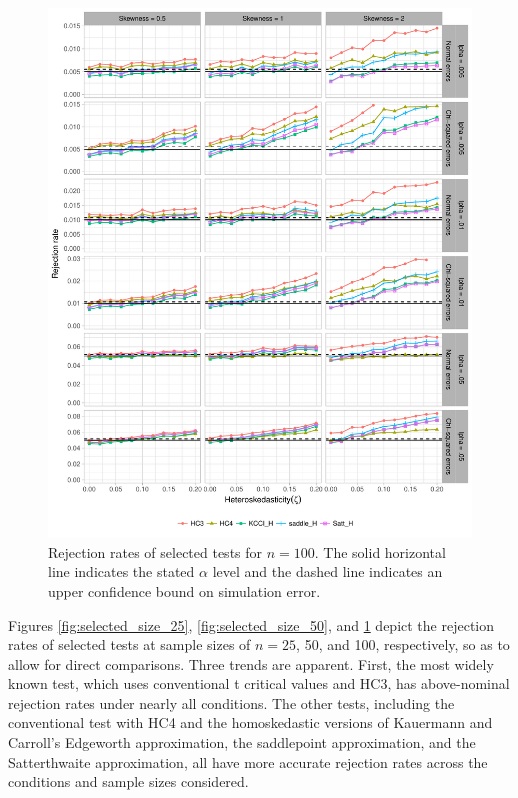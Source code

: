 \documentclass[12pt]{article}\usepackage[]{graphicx}\usepackage[]{color}
\newenvironment{knitrout}{}{} %
\begin{document}
\begin{knitrout}
\color{fgcolor}\begin{figure}[p]

{\centering \includegraphics[width=\linewidth]{HC_fig/selected_size_100-1} 

}

\caption[Rejection rates of selected tests for $n = 100$]{Rejection rates of selected tests for $n = 100$. The solid horizontal line indicates the stated $\alpha$ level and the dashed line indicates an upper confidence bound on simulation error.}\label{fig:selected_size_100}
\end{figure}


\end{knitrout}

Figures \ref{fig:selected_size_25}, \ref{fig:selected_size_50}, and \ref{fig:selected_size_100} depict the rejection rates of selected tests at sample sizes of $n = 25$, 50, and 100, respectively, so as to allow for direct comparisons. Three trends are apparent. First, the most widely known test, which uses conventional t critical values and HC3, has above-nominal rejection rates under nearly all conditions. The other tests, including the conventional test with HC4 and the homoskedastic versions of Kauermann and Carroll's Edgeworth approximation, the saddlepoint approximation, and the Satterthwaite approximation, all have more accurate rejection rates across the conditions and sample sizes considered. 
\end{document}
